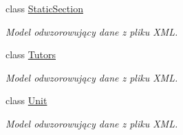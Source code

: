 \begin{DoxyCompactItemize}
class \hyperlink{a00063}{Static\+Section}
\begin{DoxyCompactList}\small\item\em Model odwzorowujący dane z pliku X\+M\+L. \end{DoxyCompactList}\item 
class \hyperlink{a00075}{Tutors}
\begin{DoxyCompactList}\small\item\em Model odwzorowujący dane z pliku X\+M\+L. \end{DoxyCompactList}\item 
class \hyperlink{a00076}{Unit}
\begin{DoxyCompactList}\small\item\em Model odwzorowujący dane z pliku X\+M\+L. \end{DoxyCompactList}\end{DoxyCompactItemize}
